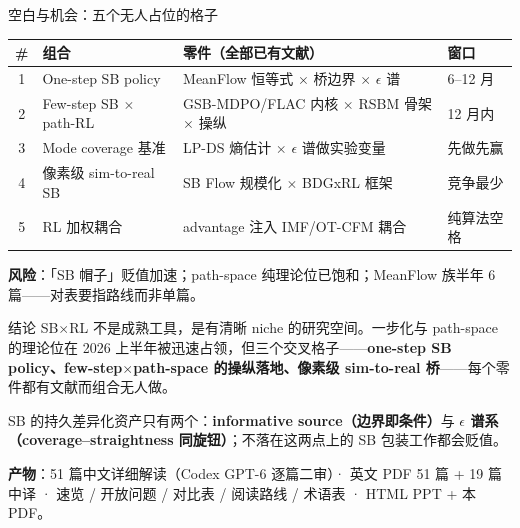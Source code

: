 \documentclass[10pt,aspectratio=169,fontset=none]{ctexbeamer}
\begin{document}
\begin{frame}{空白与机会：五个无人占位的格子}
\small
\begin{tabular}{@{}clp{}l@{}}
\toprule
\# & \textbf{组合} & \textbf{零件（全部已有文献）} & \textbf{窗口} \\
\midrule
1 & \alert{One-step SB policy} & MeanFlow 恒等式 $\times$ 桥边界 $\times$ $\epsilon$ 谱 & 6--12 月 \\
2 & Few-step SB $\times$ path-RL & GSB-MDPO/FLAC 内核 $\times$ RSBM 骨架 $\times$ 操纵 & 12 月内 \\
3 & Mode coverage 基准 & LP-DS 熵估计 $\times$ $\epsilon$ 谱做实验变量 & 先做先赢 \\
4 & 像素级 sim-to-real SB & SB Flow 规模化 $\times$ BDGxRL 框架 & 竞争最少 \\
5 & RL 加权耦合 & advantage 注入 IMF/OT-CFM 耦合 & 纯算法空格 \\
\bottomrule
\end{tabular}
\vspace{6pt}

\textbf{风险}：「SB 帽子」贬值加速；path-space 纯理论位已饱和；MeanFlow 族半年 6 篇——对表要指路线而非单篇。
\end{frame}

\begin{frame}{结论}
SB$\times$RL 不是成熟工具，是有清晰 niche 的研究空间。一步化与 path-space 的理论位在 2026 上半年被迅速占领，但三个交叉格子——\textbf{one-step SB policy、few-step$\times$path-space 的操纵落地、像素级 sim-to-real 桥}——每个零件都有文献而组合无人做。
\vspace{6pt}

SB 的持久差异化资产只有两个：\textbf{informative source（边界即条件）}与 \textbf{$\epsilon$ 谱系（coverage--straightness 同旋钮）}；不落在这两点上的 SB 包装工作都会贬值。
\vspace{10pt}

\textbf{产物}：51 篇中文详细解读（Codex GPT-6 逐篇二审）· 英文 PDF 51 篇 + 19 篇中译 · 速览 / 开放问题 / 对比表 / 阅读路线 / 术语表 · HTML PPT + 本 PDF。
\end{frame}
\end{document}
